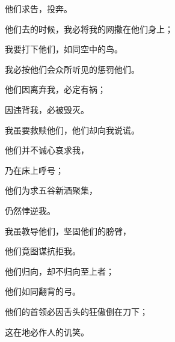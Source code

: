 {\par }{\Q 他们求告{}，投奔{}。
\par }{\Q {}他们去的时候，我必将我的网撒在他们身上；
\par }{\Q 我要打下他们，如同空中的鸟。
\par }{\Q 我必按他们会众所听见的惩罚他们。
\par }{\Q {}他们因离弃我，必定有祸；
\par }{\Q 因违背我，必被毁灭。
\par }{\Q 我虽要救赎他们，他们却向我说谎。
\par }{\BB \par }{\Q {}他们并不诚心哀求我，
\par }{\Q 乃在床上呼号；
\par }{\Q 他们为求五谷新酒聚集，
\par }{\Q 仍然悖逆我。
\par }{\Q {}我虽教导他们，坚固他们的膀臂，
\par }{\Q 他们竟图谋抗拒我。
\par }{\Q {}他们归向，却不归向至上者；
\par }{\Q 他们如同翻背的弓。
\par }{\Q 他们的首领必因舌头的狂傲倒在刀下；
\par }{\Q 这在{}地必作人的讥笑。

}
